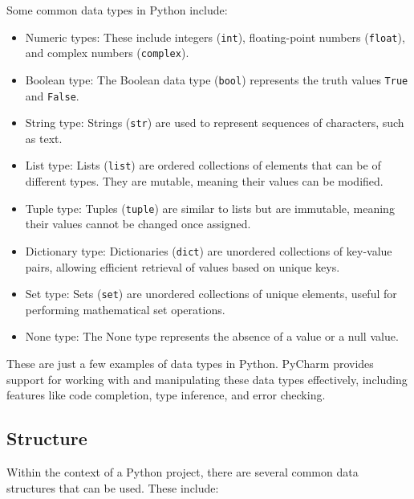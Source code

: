 Some common data types in Python include:

\begin{itemize}
	\item Numeric types: These include integers (\texttt{int}), floating-point numbers (\texttt{float}), and complex numbers (\texttt{complex}).
	\item Boolean type: The Boolean data type (\texttt{bool}) represents the truth values \texttt{True} and \texttt{False}.
	\item String type: Strings (\texttt{str}) are used to represent sequences of characters, such as text.
	\item List type: Lists (\texttt{list}) are ordered collections of elements that can be of different types. They are mutable, meaning their values can be modified.
	\item Tuple type: Tuples (\texttt{tuple}) are similar to lists but are immutable, meaning their values cannot be changed once assigned.
	\item Dictionary type: Dictionaries (\texttt{dict}) are unordered collections of key-value pairs, allowing efficient retrieval of values based on unique keys.
	\item Set type: Sets (\texttt{set}) are unordered collections of unique elements, useful for performing mathematical set operations.
	\item None type: The None type represents the absence of a value or a null value.
\end{itemize}

These are just a few examples of data types in Python. PyCharm provides support for working with and manipulating these data types effectively, including features like code completion, type inference, and error checking.



\subsection{Structure}

Within the context of a Python project, there are several common data structures that can be used. These include:

